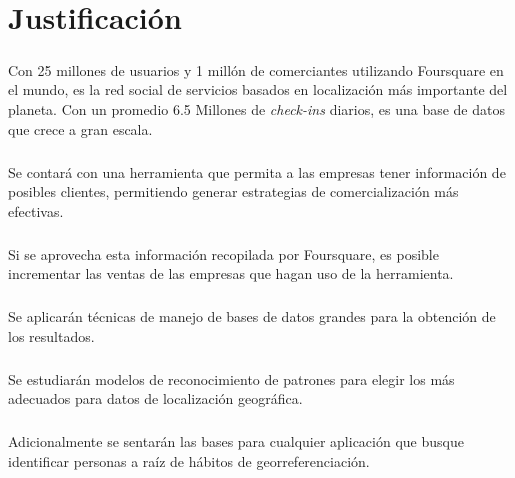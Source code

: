 \chapter{Justificaci\'on}
\label{sec:justificacion}

\paragraph{}
Con 25 millones de usuarios y 1 mill\'on de comerciantes utilizando Foursquare en el mundo, es la red social de servicios basados en localizaci\'on m\'as importante del planeta. Con un promedio 6.5 Millones de \textit{check-ins} diarios, es una base de datos que crece a gran escala.
\paragraph{}
Se contar\'a con una herramienta que permita a las empresas tener informaci\'on de posibles clientes, permitiendo generar estrategias de comercializaci\'on m\'as efectivas.
\paragraph{}
Si se aprovecha esta informaci\'on recopilada por Foursquare, es posible incrementar las ventas de las empresas que hagan uso de la herramienta.
\paragraph{}
Se aplicar\'an t\'ecnicas de manejo de bases de datos grandes para la obtenci\'on de los resultados.
\paragraph{}
Se estudiar\'an modelos de reconocimiento de patrones para elegir los m\'as adecuados para datos de localizaci\'on geogr\'afica.
\paragraph{}
Adicionalmente se sentar\'an las bases para cualquier aplicaci\'on que busque identificar personas a ra\'iz de h\'abitos de georreferenciaci\'on.

\pagebreak